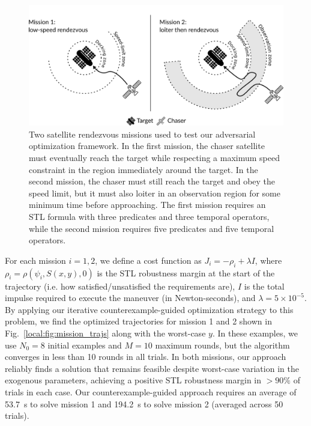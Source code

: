 \begin{figure}[t]
    \centering
    \includegraphics[width=0.7\linewidth]{images/local_methods/satellite_missions.png}
    \caption{Two satellite rendezvous missions used to test our adversarial optimization framework. In the first mission, the chaser satellite must eventually reach the target while respecting a maximum speed constraint in the region immediately around the target. In the second mission, the chaser must still reach the target and obey the speed limit, but it must also loiter in an observation region for some minimum time before approaching. The first mission requires an STL formula with three predicates and three temporal operators, while the second mission requires five predicates and five temporal operators.}
    \label{local:fig:mission_specs}
\end{figure}

For each mission $i=1, 2$, we define a cost function as $J_i = -\rho_i + \lambda I$, where $\rho_i = \rho(\psi_i, S(x, y), 0)$ is the STL robustness margin at the start of the trajectory (i.e. how satisfied/unsatisfied the requirements are), $I$ is the total impulse required to execute the maneuver (in Newton-seconds), and $\lambda = 5\times10^{-5}$. By applying our iterative counterexample-guided optimization strategy to this problem, we find the optimized trajectories for mission 1 and 2 shown in Fig.~\ref{local:fig:mission_trajs} along with the worst-case $y$. In these examples, we use $N_0=8$ initial examples and $M=10$ maximum rounds, but the algorithm converges in less than 10 rounds in all trials. In both missions, our approach reliably finds a solution that remains feasible despite worst-case variation in the exogenous parameters, achieving a positive STL robustness margin in $>90\%$ of trials in each case. Our counterexample-guided approach requires an average of \SI{53.7}{s} to solve mission 1 and \SI{194.2}{s} to solve mission 2 (averaged across 50 trials).

